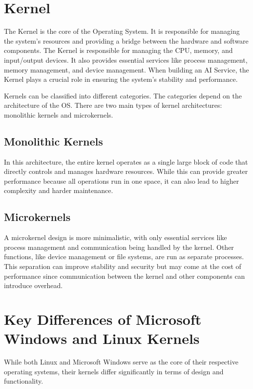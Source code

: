 \cite{TypesOfOs}

\section {Kernel}

The Kernel is the core of the Operating System. It is responsible for managing the system's resources and providing a bridge between the hardware and software components. The Kernel is responsible for managing the CPU, memory, and input/output devices. It also provides essential services like process management, memory management, and device management.
When building an AI Service, the Kernel plays a crucial role in ensuring the system's stability and performance.

Kernels can  be classified into different categories. The categories depend on the architecture of the OS. There are two main types of kernel architectures: monolithic kernels and microkernels.

\subsection{Monolithic Kernels}
In this architecture, the entire kernel operates as a single large block of code that directly controls and manages hardware resources. While this can provide greater performance because all operations run in one space, it can also lead to higher complexity and harder maintenance.

\subsection{Microkernels}
A microkernel design is more minimalistic, with only essential services like process management and communication being handled by the kernel. Other functions, like device management or file systems, are run as separate processes. This separation can improve stability and security but may come at the cost of performance since communication between the kernel and other components can introduce overhead.

\section{Key Differences of Microsoft Windows and Linux Kernels}
While both Linux and Microsoft Windows serve as the core of their respective operating systems, their kernels differ significantly in terms of design and functionality.

